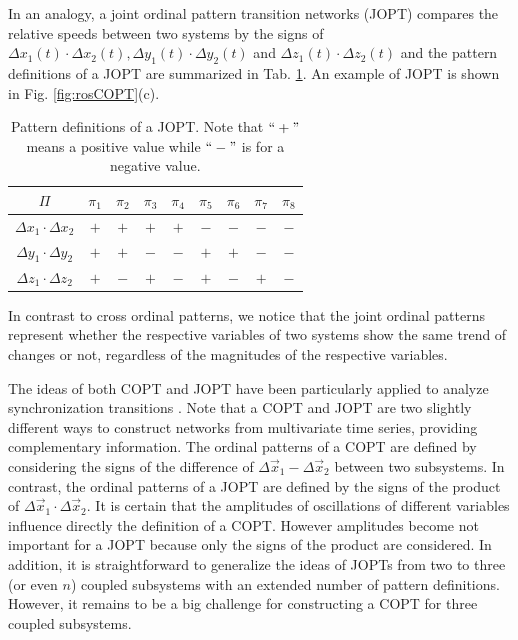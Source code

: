 		In an analogy, a joint ordinal pattern transition networks (JOPT) compares the relative speeds between two systems by the signs of $\Delta x_1(t) \cdot \Delta x_2(t), \Delta y_1(t) \cdot \Delta y_2(t)$ and $\Delta z_1(t) \cdot \Delta z_2(t)$ and the pattern definitions of a JOPT are summarized in Tab. \ref{tab:3DJOPT}. An example of JOPT is shown in Fig. \ref{fig:rosCOPT}(c).
\begin{table}[htb]
\centering
\begin{tabular}{|c|c|c|c|c|c|c|c|c|}
\hline
$\Pi$      & $\pi_1$ & $\pi_2$ & $\pi_3$ & $\pi_4$ & $\pi_5$ & $\pi_6$ & $\pi_7$
& $\pi_8$\\
\hline
$\Delta x_1 \cdot \Delta x_2$ & $+ $ & $+ $ & $+$ & $+$ & $ - $ & $ - $ & $-$ & $ - $\\
\hline
$\Delta y_1 \cdot \Delta y_2$ & $ + $ & $ + $ & $ -$ & $ -$ & $ + $ & $ + $ & $ -$ & $ -$\\
\hline
$\Delta z_1 \cdot \Delta z_2$ & $ + $ & $ - $ & $ +$ & $ -$ & $ + $ & $ - $ & $+$ & $ -$\\
\hline
\end{tabular}
\caption{Pattern definitions of a JOPT. Note that $``+"$ means a positive value while $``-"$ is for a negative value.  \label{tab:3DJOPT}}
\end{table}
In contrast to cross ordinal patterns, we notice that the joint ordinal patterns represent whether the respective variables of two systems show the same trend of changes or not, regardless of the magnitudes of the respective variables.

		The ideas of both COPT and JOPT have been particularly applied to analyze synchronization transitions \cite{Guo2018}. Note that a COPT and JOPT are two slightly different ways to construct networks from multivariate time series, providing complementary information. The ordinal patterns of a COPT are defined by considering the signs of the difference of $\Delta \vec{x}_1 - \Delta \vec{x}_2$ between two subsystems. In contrast, the ordinal patterns of a JOPT  are defined by the signs of the product of $\Delta \vec{x}_1 \cdot \Delta \vec{x}_2$. It is certain that the amplitudes of oscillations of different variables influence directly the definition of a COPT. However amplitudes become not important for a JOPT because only the signs of the product are considered. In addition, it is straightforward to generalize the ideas of JOPTs from two to three (or even $n$) coupled subsystems with an extended number of pattern definitions. However, it remains to be a big challenge for constructing a COPT for three coupled subsystems. 

